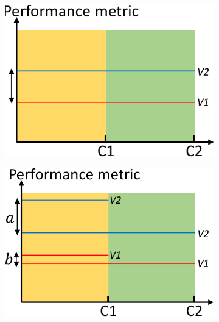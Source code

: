 
\begin{figure}[t]
	\centering
        \begin{subfigure}{0.25\textwidth}
                \includegraphics[width=\linewidth]{Figures/background-a.pdf}
                \caption{}
                \label{fig:description-a}
        \end{subfigure}%
        \begin{subfigure}{0.25\textwidth}
                \includegraphics[width=\linewidth]{Figures/background-b.pdf}

\end{subfigure}
\end{figure}
